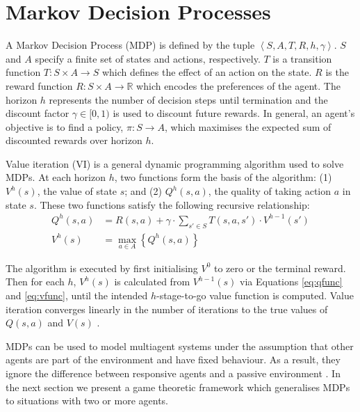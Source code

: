 \section{Markov Decision Processes}
\label{sec:mdp}

A Markov Decision Process (MDP) \cite{Howard_1960} is defined by the tuple
$ \left\langle S, A, T, R, h, \gamma \right\rangle$. $S$ and $A$ 
specify a finite set of states and actions, respectively.
$T$ is a transition function $T : S \times A \rightarrow S$ which 
defines the effect of an action on the state. $R$ is the
reward function $R : S \times A \rightarrow \mathbb{R}$ which 
encodes the preferences of the agent. The horizon $h$ represents the 
number of decision steps until termination and the discount factor $\gamma \in [0, 1)$ 
is used to discount future rewards. In general, an agent's objective is 
to find a policy, $\pi : S \rightarrow A$, which maximises the expected 
sum of discounted rewards over horizon $h$.

Value iteration (VI) \cite{Bellman_1957} is a general dynamic programming 
algorithm used to solve MDPs. At each horizon $h$, two functions form 
the basis of the algorithm: (1) $V^{h}(s)$, the value of state $s$; and 
(2) $Q^{h}(s, a)$, the quality of taking action $a$ in state $s$. 
These two functions satisfy the following recursive relationship:
{\small 
\begin{align}
  Q^{h}(s, a) &= R(s, a) + \gamma \cdot \sum_{s' \in S} T(s, a, s') \cdot V^{h-1}(s') \label{eq:qfunc}\\
  V^{h}(s) &= \max_{a \in A} \left\{ Q^{h}(s, a) \right\} \label{eq:vfunc}
\end{align}
}%

The algorithm is executed by first initialising $V^{0}$  to zero or the terminal reward. 
Then for each $h$, $V^{h}(s)$ is calculated from $V^{h-1}(s)$ via
Equations \eqref{eq:qfunc} and \eqref{eq:vfunc}, until the intended 
$h$-stage-to-go value function is computed. Value iteration converges 
linearly in the number of iterations to the true values of $Q(s, a)$ and $V(s)$ \cite{Bertsekas_1987}.

MDPs can be used to model multiagent systems under the assumption 
that other agents are part of the environment and have fixed behaviour. 
As a result, they ignore the difference between responsive agents and 
a passive environment \cite{Hu_ICML_1998}. In the next section we 
present a game theoretic framework which generalises MDPs to 
situations with two or more agents.